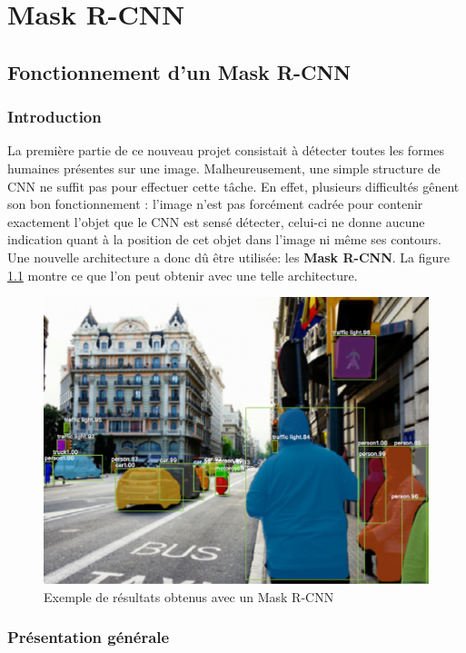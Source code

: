 

\chapter{Mask R-CNN}

\section{Fonctionnement d'un Mask R-CNN}

\subsection{Introduction}

La première partie de ce nouveau projet consistait à détecter toutes les formes humaines présentes sur une image. Malheureusement, une simple structure de CNN ne suffit pas pour effectuer cette tâche. En effet, plusieurs difficultés gênent son bon fonctionnement : l'image n'est pas forcément cadrée pour contenir exactement l'objet que le CNN est sensé détecter, celui-ci ne donne aucune indication quant à la position de cet objet dans l'image ni même ses contours. Une nouvelle architecture a donc dû être utilisée: les \textbf{Mask R-CNN}. La figure \ref{result_mask_r_cnn} montre ce que l'on peut obtenir avec une telle architecture.

\begin{figure}[!h]
\centering
\includegraphics[width=200pts]{images/Mask_R_CNN/mask_r_cnn.png} 
\caption{Exemple de résultats obtenus avec un Mask R-CNN}
\label{result_mask_r_cnn}
\end{figure}

\subsection{Présentation générale}

